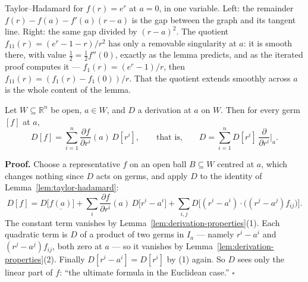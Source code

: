\documentclass[11pt]{report}
\makeatletter
\newcounter{thmcounter}[section]
\renewenvironment{proof}[1][Proof]{\noindent\textbf{#1.} }{\hfill$\square$\par\vspace{5pt}}
\newcommand{\thmlabel}[1]{\edef\@currentlabel{\arabic{section}.\arabic{thmcounter}}\label{#1}}
\newcommand{\leeref}[1]{\par\smallskip{\raggedleft\footnotesize\textsc{Lee}:\ #1\par}}
\makeatother
\begin{document}
\begin{center}
\end{center}

Taylor--Hadamard for $f(r) = e^r$ at $a = 0$, in one variable. Left: the remainder $f(r) - f(a) - f'(a)(r-a)$ is the gap between the graph and its tangent line. Right: the same gap divided by $(r - a)^2$. The quotient $f_{11}(r) = (e^r - 1 - r)/r^2$ has only a removable singularity at $a$: it is smooth there, with value $\tfrac12 = \tfrac12 f''(0)$, exactly as the lemma predicts, and as the iterated proof computes it --- $f_1(r) = (e^r - 1)/r$, then $f_{11}(r) = (f_1(r) - f_1(0))/r$. That the quotient extends smoothly across $a$ is the whole content of the lemma.

\begin{corbox}\thmlabel{cor:derivations-Rn}
Let $W \subseteq \mathbb{R}^n$ be open, $a \in W$, and $D$ a derivation at $a$ on $W$. Then for every germ $[f]$ at $a$,
\[
D[f] = \sum_{i=1}^n \frac{\partial f}{\partial r^i}(a)\, D[r^i], \qquad\text{that is,}\qquad D = \sum_{i=1}^n D[r^i]\, \frac{\partial}{\partial r^i}\Big|_a .
\]
\leeref{Proposition 3.2 and Corollary 3.3}
\end{corbox}

\begin{proof}
Choose a representative $f$ on an open ball $B \subseteq W$ centred at $a$, which changes nothing since $D$ acts on germs, and apply $D$ to the identity of Lemma~\ref{lem:taylor-hadamard}:
\[
D[f] = D\big[\underline{f(a)}\big] + \sum_{i} \frac{\partial f}{\partial r^i}(a)\, D\big[r^i - a^i\big] + \sum_{i,j} D\Big[(r^i - a^i)\cdot\big((r^j - a^j) f_{ij}\big)\Big].
\]
The constant term vanishes by Lemma~\ref{lem:derivation-properties}(1). Each quadratic term is $D$ of a product of two germs in $I_a$ --- namely $r^i - a^i$ and $(r^j - a^j)f_{ij}$, both zero at $a$ --- so it vanishes by Lemma~\ref{lem:derivation-properties}(2). Finally $D[r^i - a^i] = D[r^i]$ by (1) again. So $D$ sees only the linear part of $f$: ``the ultimate formula in the Euclidean case.''
\end{proof}
\end{document}
